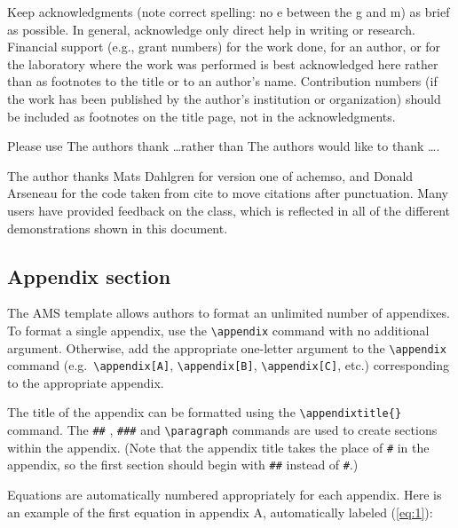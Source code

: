 \documentclass[draft]{ametsoc}
\begin{document}
\acknowledgments

Keep acknowledgments (note correct spelling: no e between the g and m)
as brief as possible. In general, acknowledge only direct help in
writing or research. Financial support (e.g., grant numbers) for the
work done, for an author, or for the laboratory where the work was
performed is best acknowledged here rather than as footnotes to the
title or to an author's name. Contribution numbers (if the work has been
published by the author's institution or organization) should be
included as footnotes on the title page, not in the acknowledgments.

Please use The authors thank \ldots rather than The authors would like
to thank \ldots.

The author thanks Mats Dahlgren for version one of \textsf{achemso}, and
Donald Arseneau for the code taken from \textsf{cite} to move citations
after punctuation. Many users have provided feedback on the class, which
is reflected in all of the different demonstrations shown in this
document.

\appendix[A]


\subsection{Appendix section}\label{appendix-section}

The AMS template allows authors to format an unlimited number of
appendixes. To format a single appendix, use the
\texttt{\textbackslash{}appendix} command with no additional argument.
Otherwise, add the appropriate one-letter argument to the
\texttt{\textbackslash{}appendix} command
(e.g.~\texttt{\textbackslash{}appendix{[}A{]}},
\texttt{\textbackslash{}appendix{[}B{]}},
\texttt{\textbackslash{}appendix{[}C{]}}, etc.) corresponding to the
appropriate appendix.

The title of the appendix can be formatted using the
\texttt{\textbackslash{}appendixtitle\{\}} command. The \texttt{\#\#} ,
\texttt{\#\#\#} and \texttt{\textbackslash{}paragraph} commands are used
to create sections within the appendix. (Note that the appendix title
takes the place of \texttt{\#} in the appendix, so the first section
should begin with \texttt{\#\#} instead of \texttt{\#}.)

Equations are automatically numbered appropriately for each appendix.
Here is an example of the first equation in appendix A, automatically
labeled (\ref{eq:1}):
\end{document}
